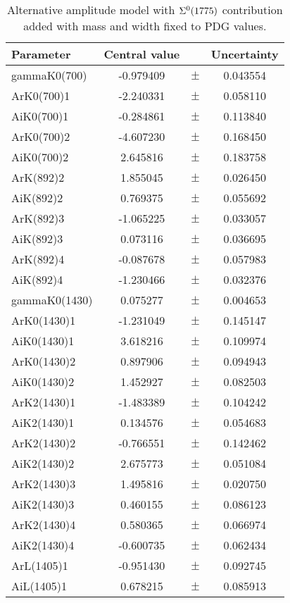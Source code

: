\clearpage

\begin{table}
\centering
\caption{Alternative amplitude model with ${{\Sigma}{}^0}(1775)$ contribution added with mass and width fixed to PDG values.}
\begin{tiny}
\begin{tabular}{lccc}
\toprule
Parameter & Central value & & Uncertainty\\
\midrule 
gammaK0(700) & -0.979409 & $\pm$ & 0.043554 \\
ArK0(700)1 & -2.240331 & $\pm$ & 0.058110 \\
AiK0(700)1 & -0.284861 & $\pm$ & 0.113840 \\
ArK0(700)2 & -4.607230 & $\pm$ & 0.168450 \\
AiK0(700)2 & 2.645816 & $\pm$ & 0.183758 \\
ArK(892)2 & 1.855045 & $\pm$ & 0.026450 \\
AiK(892)2 & 0.769375 & $\pm$ & 0.055692 \\
ArK(892)3 & -1.065225 & $\pm$ & 0.033057 \\
AiK(892)3 & 0.073116 & $\pm$ & 0.036695 \\
ArK(892)4 & -0.087678 & $\pm$ & 0.057983 \\
AiK(892)4 & -1.230466 & $\pm$ & 0.032376 \\
gammaK0(1430) & 0.075277 & $\pm$ & 0.004653 \\
ArK0(1430)1 & -1.231049 & $\pm$ & 0.145147 \\
AiK0(1430)1 & 3.618216 & $\pm$ & 0.109974 \\
ArK0(1430)2 & 0.897906 & $\pm$ & 0.094943 \\
AiK0(1430)2 & 1.452927 & $\pm$ & 0.082503 \\
ArK2(1430)1 & -1.483389 & $\pm$ & 0.104242 \\
AiK2(1430)1 & 0.134576 & $\pm$ & 0.054683 \\
ArK2(1430)2 & -0.766551 & $\pm$ & 0.142462 \\
AiK2(1430)2 & 2.675773 & $\pm$ & 0.051084 \\
ArK2(1430)3 & 1.495816 & $\pm$ & 0.020750 \\
AiK2(1430)3 & 0.460155 & $\pm$ & 0.086123 \\
ArK2(1430)4 & 0.580365 & $\pm$ & 0.066974 \\
AiK2(1430)4 & -0.600735 & $\pm$ & 0.062434 \\
ArL(1405)1 & -0.951430 & $\pm$ & 0.092745 \\
AiL(1405)1 & 0.678215 & $\pm$ & 0.085913 \\

\end{tabular}
\end{tiny}
\end{table}
